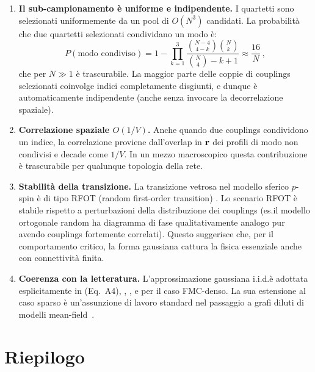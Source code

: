 \documentclass[11pt,a4paper]{article}
\begin{document}
\begin{enumerate}[nosep]
  \item \textbf{Il sub-campionamento \`e uniforme e indipendente.}
    I quartetti sono selezionati uniformemente da un pool di $O(N^3)$
    candidati. La probabilit\`a che due quartetti selezionati
    condividano un modo \`e:
    \begin{equation}
      P(\text{modo condiviso})
      = 1 - \prod_{k=1}^{3}\frac{\binom{N-4}{4-k}\binom{N}{k}}{\binom{N}{4}-k+1}
      \approx \frac{16}{N}\,,
    \end{equation}
    che per $N \gg 1$ \`e trascurabile. La maggior parte delle coppie di
    couplings selezionati coinvolge indici completamente disgiunti, e
    dunque \`e automaticamente indipendente (anche senza invocare la
    decorrelazione spaziale).

  \item \textbf{Correlazione spaziale $O(1/V)$.}
    Anche quando due couplings condividono un indice, la correlazione
    proviene dall'overlap in $\vb{r}$ dei profili di modo non condivisi
    e decade come $1/V$. In un mezzo macroscopico questa contribuzione
    \`e trascurabile per qualunque topologia della rete.

  \item \textbf{Stabilit\`a della transizione.}
    La transizione vetrosa nel modello sferico $p$-spin \`e di tipo
    RFOT (random first-order transition) \cite{Kirkpatrick1989}.
    Lo scenario RFOT \`e stabile rispetto a perturbazioni della
    distribuzione dei couplings (es.\@ il modello ortogonale random
    \cite{Marinari1994, Parisi1995} ha diagramma di fase qualitativamente
    analogo pur avendo couplings fortemente correlati). Questo suggerisce
    che, per il comportamento critico, la forma gaussiana cattura la
    fisica essenziale anche con connettivit\`a finita.

  \item \textbf{Coerenza con la letteratura.}
    L'approssimazione gaussiana i.i.d.\@ \`e adottata esplicitamente in
    \cite{Gradenigo2020} (Eq.~A4), \cite{Antenucci2015a},
    \cite{Antenucci2015b}, e \cite{Angelani2006} per il caso
    FMC-denso. La sua estensione al caso sparso \`e un'assunzione di
    lavoro standard nel passaggio a grafi diluti di modelli
    mean-field~\cite{MPV1987}.
\end{enumerate}

\section{Riepilogo}\label{sec:summary}
\end{document}
